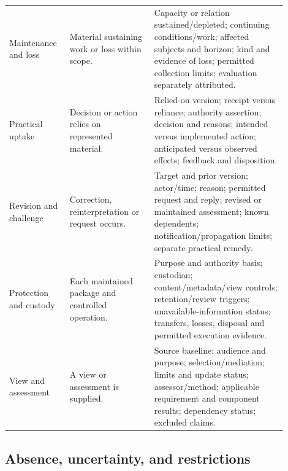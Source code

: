\documentclass[11pt,a4paper]{article}
\begin{document}
\begin{longtable}{@{}L{0.18\linewidth}L{0.28\linewidth}L{0.44\linewidth}@{}}
Maintenance and loss & Material sustaining work or loss within scope. & Capacity or relation sustained/depleted; continuing conditions/work; affected subjects and horizon; kind and evidence of loss; permitted collection limits; evaluation separately attributed.\\
Practical uptake & Decision or action relies on represented material. & Relied-on version; receipt versus reliance; authority assertion; decision and reasons; intended versus implemented action; anticipated versus observed effects; feedback and disposition.\\
Revision and challenge & Correction, reinterpretation or request occurs. & Target and prior version; actor/time; reason; permitted request and reply; revised or maintained assessment; known dependents; notification/propagation limits; separate practical remedy.\\
Protection and custody & Each maintained package and controlled operation. & Purpose and authority basis; custodian; content/metadata/view controls; retention/review triggers; unavailable-information status; transfers, losses, disposal and permitted execution evidence.\\
View and assessment & A view or assessment is supplied. & Source baseline; audience and purpose; selection/mediation; limits and update status; assessor/method; applicable requirement and component results; dependency status; excluded claims.\\
\bottomrule
\end{longtable}

\subsection{Absence, uncertainty, and restrictions}
\end{document}
